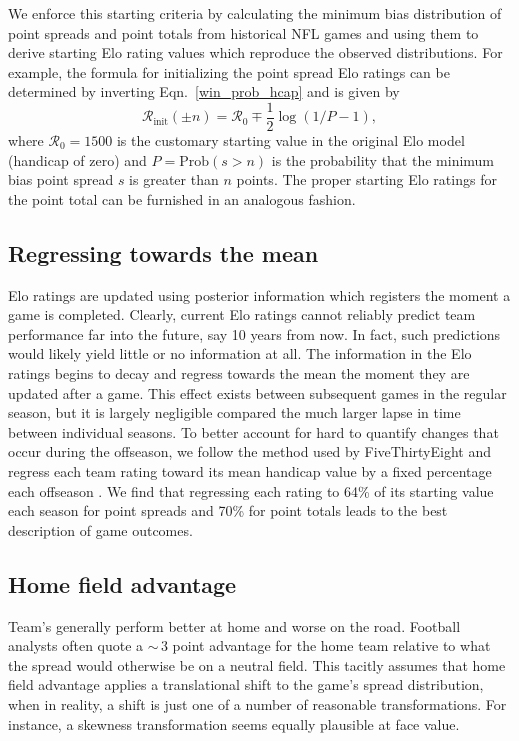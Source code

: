 \documentclass[aps,prc,reprint,amsmath,superscriptaddress,nofootinbib]{revtex4-1}
\begin{document}
We enforce this starting criteria by calculating the minimum bias distribution of point spreads and point totals from historical NFL games and using them to derive starting Elo rating values which reproduce the observed distributions.
For example, the formula for initializing the point spread Elo ratings can be determined by inverting Eqn.~\eqref{win_prob_hcap} and is given by
\begin{equation}
  \mathcal{R}_\text{init}(\pm n) = \mathcal{R}_0 \mp \frac{1}{2} \log\left(1/P - 1 \right),
\end{equation}
where $\mathcal{R}_0 = 1500$ is the customary starting value in the original Elo model (handicap of zero) and ${P=\mathrm{Prob}(s > n)}$ is the probability that the minimum bias point spread $s$ is greater than $n$ points.
The proper starting Elo ratings for the point total can be furnished in an analogous fashion.

\subsection{Regressing towards the mean}

Elo ratings are updated using posterior information which registers the moment a game is completed.
Clearly, current Elo ratings cannot reliably predict team performance far into the future, say 10 years from now.
In fact, such predictions would likely yield little or no information at all.
The information in the Elo ratings begins to decay and regress towards the mean the moment they are updated after a game.
This effect exists between subsequent games in the regular season, but it is largely negligible compared the much larger lapse in time between individual seasons.
To better account for hard to quantify changes that occur during the offseason, we follow the method used by FiveThirtyEight and regress each team rating toward its mean handicap value by a fixed percentage each offseason \cite{538NFL, 538NBA}.
We find that regressing each rating to 64\% of its starting value each season for point spreads and 70\% for point totals leads to the best description of game outcomes.

\subsection{Home field advantage}

Team's generally perform better at home and worse on the road.
Football analysts often quote a ${\sim}\,3$ point advantage for the home team relative to what the spread would otherwise be on a neutral field. 
This tacitly assumes that home field advantage applies a translational shift to the game's spread distribution, when in reality, a shift is just one of a number of reasonable transformations.
For instance, a skewness transformation seems equally plausible at face value.
\end{document}
